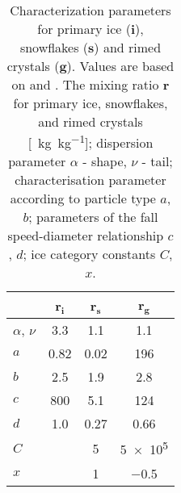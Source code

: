 \begin{table}[!t]
	\begin{center}
		\caption{Characterization parameters for primary ice ($\mathbf{i}$), snowflakes ($\mathbf{s}$) and rimed crystals ($\mathbf{g}$). Values are based on \cite{meteo_france_meso-nh_2009} and \cite{pinty_mixed-phased_1998}. 
        The mixing ratio \textbf{r} for primary ice, snowflakes, and rimed crystals [\SI{}{\kg\per\kg}]; 
        dispersion parameter $\alpha$ - shape, $\nu$ - tail; characterisation parameter according to particle type $a$, $b$; parameters of the fall speed-diameter relationship $c$, $d$; ice category constants $C$, $x$.}\label{tab:ice_parameter}
		\begin{tabular}{l|c|c|c}
			\hline \hline
            				& \textbf{r$\mathbf{_i}$}& \textbf{r$\mathbf{_s}$}& \textbf{r$\mathbf{_g}$} \\ \hline\hline
            $\alpha$, $\nu$ & \num{3.3}		& \num{1.1}			& \num{1.1} \\ \hline
            $a$				& \num{0.82}	& \num{0.02}		& \num{196} \\ 
            $b$				& \num{2.5}		& \num{1.9}			& \num{2.8} \\ \hline
            $c$				& \num{800}		& \num{5.1}			& \num{124} \\ 
            $d$				& \num{1.0}		& \num{0.27}		& \num{0.66} \\ \hline
            $C$				&				& \num{5}			& \num{5e5} \\
            $x$				&				& \num{1}			& \num{-0.5} \\
			\hline \hline
		\end{tabular}
	\end{center}
\end{table}